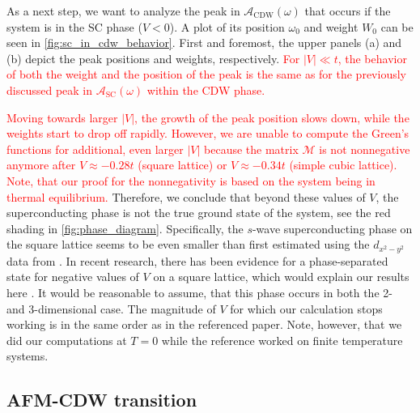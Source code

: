 \documentclass[
    reprint, 
    aps,
    preprintnumbers,
    twocolumn,
    prb,
    superscriptaddress
]{revtex4-2}
\newcommand{\mM}{\mathcal{M}}
\newcommand{\spectral}[1]{\mathcal{A}_\text{#1}  (\omega)}
\begin{document}

As a next step, we want to analyze the peak in $\spectral{CDW}$ that occurs if the system is in the SC phase ($V<0$).
A plot of its position $\omega_0$ and weight $W_0$ can be seen in \autoref{fig:sc_in_cdw_behavior}.
First and foremost, the upper panels (a) and (b) depict the peak positions and weights, respectively.
\textcolor{red}{For $|V| \ll t$, the behavior of both the weight and the position of the peak is the same as for the previously discussed peak in $\spectral{SC}$ within the CDW phase.}

\textcolor{red}{Moving towards larger $|V|$, the growth of the peak position slows down, while the weights start to drop off rapidly.
However, we are unable to compute the Green's functions for additional, even larger $|V|$ because the matrix $\mM$ is not nonnegative anymore after $V\approx -0.28t$ (square lattice) or $V\approx -0.34t$ (simple cubic lattice).
Note, that our proof for the nonnegativity is based on the system being in thermal equilibrium.}
Therefore, we conclude that beyond these values of $V$, the superconducting phase is not the true ground state of the system, see the red shading in \autoref{fig:phase_diagram}.
Specifically, the $s$-wave superconducting phase on the square lattice seems to be even smaller than first estimated using the $d_{x^2 -y^2}$ data from \cite{Micnas88b}.
In recent research, there has been evidence for a phase-separated state for negative values of $V$ on a square lattice, which would explain our results here \cite{Linner23}.
It would be reasonable to assume, that this phase occurs in both the 2- and 3-dimensional case.
The magnitude of $V$ for which our calculation stops working is in the same order as in the referenced paper.
Note, however, that we did our computations at $T=0$ while the reference worked on finite temperature systems.



\subsection{AFM-CDW transition}
\end{document}
